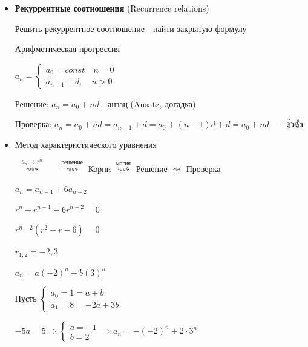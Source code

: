 \documentclass[12pt]{article}
\begin{document}
    \begin{itemize}
        \item \textbf{Рекуррентные соотношения} (Recurrence relations)

        \underline{Решить рекуррентное соотношение} - найти закрытую формулу

        \Ex Арифметическая прогрессия

        $a_n = \begin{cases}a_0 = const \quad n = 0 \\ a_{n - 1} + d, \quad n > 0\end{cases}$

        Решение: $a_n = a_0 + nd$ - анзац (Ansatz, догадка)

        Проверка: $a_n = a_0 + nd = a_{n - 1} + d = a_0 + (n - 1)d + d = a_0 + nd \quad$ - {\Large👍👍}

        \item Метод характеристического уравнения

         \ $\stackrel{a_n \to r^n}{\rightsquigarrow}$ \  \ $\stackrel{\text{решение}}{\rightsquigarrow}$ Корни $\stackrel{\text{магия}}{\rightsquigarrow}$ Решение $\rightsquigarrow$ Проверка

        \Ex $a_n = a_{n - 1} + 6a_{n - 2}$

        $r^n - r^{n - 1} - 6r^{n - 2} = 0$

        $r^{n-  2} (r^2 - r - 6) = 0$

        $r_{1,2} = -2, 3$


        \vspace{3mm}

        $a_n = a(-2)^n + b(3)^n$

        Пусть $\begin{cases}a_0 = 1 = a + b \\ a_1 = 8 = -2a + 3b\end{cases}$

        $-5a = 5 \Longrightarrow \begin{cases}a = -1 \\ b = 2\end{cases} \Longrightarrow a_n = -(-2)^n + 2 \cdot 3^n$


\end{itemize}
\end{document}
